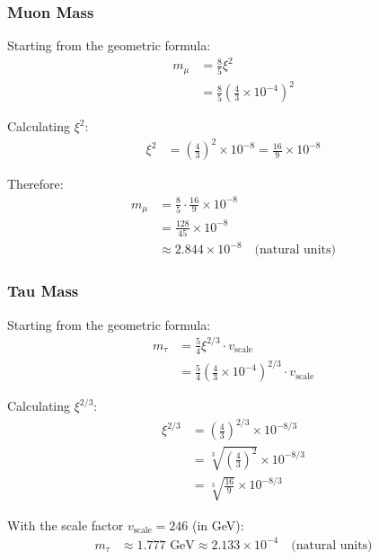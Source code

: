 \documentclass[12pt,a4paper]{article}
\newcommand{\xipar}{\xi}  %
\begin{document}
	\subsubsection{Muon Mass}
	
	\begin{keyresult}
		Starting from the geometric formula:
		\begin{align}
			m_\mu &= \frac{8}{5} \xipar^{2} \\
			&= \frac{8}{5} \left(\frac{4}{3} \times 10^{-4}\right)^{2}
		\end{align}
		
		Calculating $\xipar^{2}$:
		\begin{align}
			\xipar^{2} &= \left(\frac{4}{3}\right)^{2} \times 10^{-8} = \frac{16}{9} \times 10^{-8}
		\end{align}
		
		Therefore:
		\begin{align}
			m_\mu &= \frac{8}{5} \cdot \frac{16}{9} \times 10^{-8} \\
			&= \frac{128}{45} \times 10^{-8} \\
			&\approx 2.844 \times 10^{-8} \quad \text{(natural units)}
		\end{align}
	\end{keyresult}
	
	\subsubsection{Tau Mass}
	
	\begin{keyresult}
		Starting from the geometric formula:
		\begin{align}
			m_\tau &= \frac{5}{4} \xipar^{2/3} \cdot v_{\text{scale}} \\
			&= \frac{5}{4} \left(\frac{4}{3} \times 10^{-4}\right)^{2/3} \cdot v_{\text{scale}}
		\end{align}
		
		Calculating $\xipar^{2/3}$:
		\begin{align}
			\xipar^{2/3} &= \left(\frac{4}{3}\right)^{2/3} \times 10^{-8/3} \\
			&= \sqrt[3]{\left(\frac{4}{3}\right)^2} \times 10^{-8/3} \\
			&= \sqrt[3]{\frac{16}{9}} \times 10^{-8/3}
		\end{align}
		
		With the scale factor $v_{\text{scale}} = 246$ (in GeV):
		\begin{align}
			m_\tau &\approx 1.777 \text{ GeV} \approx 2.133 \times 10^{-4} \quad \text{(natural units)}
		\end{align}
	\end{keyresult}
	
\end{document}
